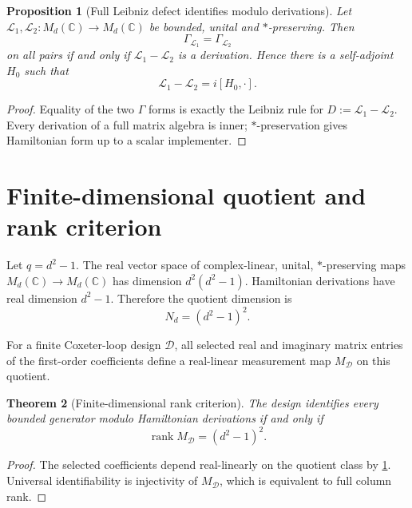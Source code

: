 \documentclass[11pt]{article}
\newtheorem{theorem}{Theorem}[section]
\newtheorem{proposition}[theorem]{Proposition}
\theoremstyle{definition}
\theoremstyle{remark}
\newcommand{\Md}{M_d(\mathbb C)}
\newcommand{\rank}{\operatorname{rank}}
\begin{document}
\begin{proposition}[Full Leibniz defect identifies modulo derivations]\label{prop:gamma-ident}
Let $\mathcal L_1,\mathcal L_2:\Md\to\Md$ be bounded, unital and $*$-preserving. Then
\[
\Gamma_{\mathcal L_1}=\Gamma_{\mathcal L_2}
\]
on all pairs if and only if $\mathcal L_1-\mathcal L_2$ is a derivation. Hence there is a self-adjoint $H_0$ such that
\begin{equation}\label{eq:mod-derivation}
\mathcal L_1-\mathcal L_2=i[H_0,\cdot].
\end{equation}
\end{proposition}
\begin{proof}
Equality of the two $\Gamma$ forms is exactly the Leibniz rule for $D:=\mathcal L_1-\mathcal L_2$. Every derivation of a full matrix algebra is inner; $*$-preservation gives Hamiltonian form up to a scalar implementer.
\end{proof}

\section{Finite-dimensional quotient and rank criterion}
Let $q=d^2-1$. The real vector space of complex-linear, unital, $*$-preserving maps $\Md\to\Md$ has dimension $d^2(d^2-1)$. Hamiltonian derivations have real dimension $d^2-1$. Therefore the quotient dimension is
\begin{equation}\label{eq:quotient-dim}
N_d=(d^2-1)^2.
\end{equation}

For a finite Coxeter-loop design $\mathscr D$, all selected real and imaginary matrix entries of the first-order coefficients define a real-linear measurement map $M_{\mathscr D}$ on this quotient.

\begin{theorem}[Finite-dimensional rank criterion]\label{thm:rank-criterion}
The design identifies every bounded generator modulo Hamiltonian derivations if and only if
\begin{equation}\label{eq:full-rank}
\rank M_{\mathscr D}=(d^2-1)^2.
\end{equation}
\end{theorem}
\begin{proof}
The selected coefficients depend real-linearly on the quotient class by \cref{prop:gamma-ident}. Universal identifiability is injectivity of $M_{\mathscr D}$, which is equivalent to full column rank.
\end{proof}
\end{document}
